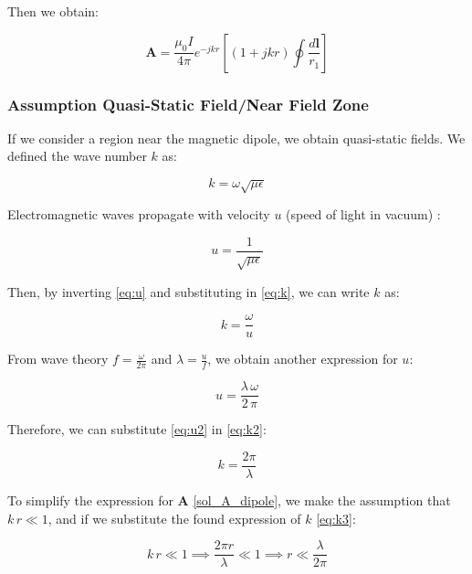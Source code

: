 Then we obtain:

\begin{equation}
    \mathbf{A} = \frac{\mu_0 I}{4 \pi} e^{-j k r} 
    \left[ \left(1 + j k r \right) \oint 
    \frac{d\mathbf{l}}{r_1}\right]
    \label{eq:sol_A_simp}
\end{equation}
\subsubsection{Assumption Quasi-Static Field/Near Field Zone}
If we consider a region near the magnetic dipole, we 
obtain quasi-static fields. We defined the wave number 
$k$ as:

\begin{equation}
    k = \omega \sqrt{\mu \epsilon}
    \label{eq:k}
\end{equation}

Electromagnetic waves propagate with velocity $u$ 
(speed of light in vacuum) \cite{book-magnetism}:

\begin{equation}
    u = \frac{1}{\sqrt{\mu \epsilon}}
    \label{eq:u}
\end{equation}

Then, by inverting \ref{eq:u} and substituting in 
\ref{eq:k}, we can write $k$ as:

\begin{equation}
    k = \frac{\omega}{u}
    \label{eq:k2}
\end{equation}

From wave theory $f = \frac{\omega}{2\pi}$ and 
$\lambda = \frac{u}{f}$, we obtain another expression 
for $u$:

\begin{equation}
   u = \frac{\lambda \, \omega}{2 \, \pi}
\end{equation}
\label{eq:u2}

\noindent Therefore, we can substitute \ref{eq:u2} in 
\ref{eq:k2}:

\begin{equation}
    k = \frac{2 \pi}{\lambda}
    \label{eq:k3}
\end{equation}

To simplify the expression for $\mathbf{A}$ 
\ref{sol_A_dipole}, we make the assumption that 
$k \, r \ll 1$, and if we substitute the found 
expression of $k$ \ref{eq:k3}:

\[
    k \, r \ll 1 \implies \frac{2\pi r}{\lambda} 
    \ll 1 \implies r \ll \frac{\lambda}{2\pi}
\]

